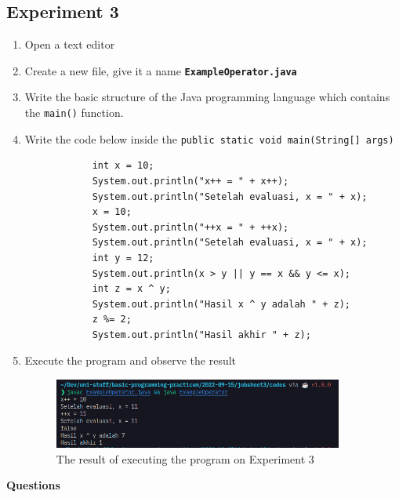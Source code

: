 \documentclass[12pt,titlepage]{article}
\begin{document}
\subsection{Experiment 3}
\begin{enumerate}
    \item Open a text editor
    \item Create a new file, give it a name \texttt{\textbf{ExampleOperator.java}}
    \item Write the basic structure of the Java programming language which contains the \texttt{main()} function.
    \item {
        Write the code below inside the \texttt{public static void main(String[] args)}

        \begin{verbatim}
            int x = 10;
            System.out.println("x++ = " + x++);
            System.out.println("Setelah evaluasi, x = " + x);
            x = 10;
            System.out.println("++x = " + ++x);
            System.out.println("Setelah evaluasi, x = " + x);
            int y = 12;
            System.out.println(x > y || y == x && y <= x);
            int z = x ^ y;
            System.out.println("Hasil x ^ y adalah " + z);
            z %= 2;
            System.out.println("Hasil akhir " + z);
        \end{verbatim}
    }
    \item {
        Execute the program and observe the result

        \begin{figure}[h]
            \centering
            \includegraphics[width=0.9\textwidth]{./images/operator-output.png}
            \caption{The result of executing the program on Experiment 3}
        \end{figure}
    }
\end{enumerate}
\textbf{Questions}
\end{document}
